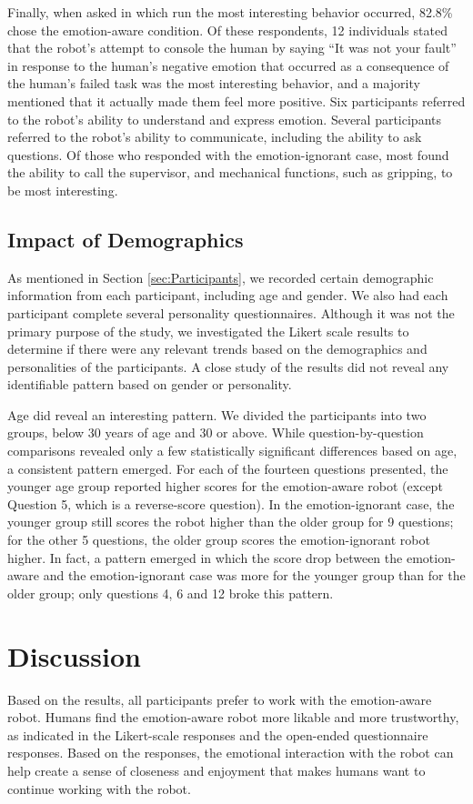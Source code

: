 \documentclass{sig-alternate-05-2015}
\begin{document}
Finally, when asked in which run the most interesting behavior occurred, 82.8\%
chose the emotion-aware condition. Of these respondents, 12 individuals stated
that the robot's attempt to console the human by saying ``It was not your
fault'' in response to the human's negative emotion that occurred as a
consequence of the human's failed task was the most interesting behavior, and a
majority mentioned that it actually made them feel more positive. Six
participants referred to the robot's ability to understand and express emotion.
Several participants referred to the robot's ability to communicate, including
the ability to ask questions. Of those who responded with the emotion-ignorant
case, most found the ability to call the supervisor, and mechanical functions,
such as gripping, to be most interesting.

\subsection{Impact of Demographics} 
As mentioned in Section \ref{sec:Participants}, we recorded certain demographic
information from each participant, including age and gender. We also had each
participant complete several personality questionnaires. Although it was not the
primary purpose of the study, we investigated the Likert scale results to
determine if there were any relevant trends based on the demographics and
personalities of the participants. A close study of the results did  not reveal
any identifiable pattern based on gender or personality.
 
Age did reveal an interesting pattern. We divided the participants into two
groups, below 30 years of age and 30 or above. While question-by-question
comparisons revealed only a few statistically significant differences based on
age, a consistent pattern emerged. For each of the fourteen questions presented,
the younger age group reported higher scores for the emotion-aware robot (except
Question 5, which is a reverse-score question). In the emotion-ignorant case,
the younger group still scores the robot higher than the older group for 9
questions; for the other 5 questions, the older group scores the
emotion-ignorant robot higher. In fact, a pattern emerged in which the score
drop between the emotion-aware and the emotion-ignorant case was more for the
younger group than for the older group; only questions 4, 6 and 12 broke this
pattern.

\vspace*{-2mm}
\section{Discussion}
Based on the results, all participants prefer to work with the emotion-aware
robot. Humans find the emotion-aware robot more likable and more trustworthy, as
indicated in the Likert-scale responses and the open-ended questionnaire
responses. Based on the responses, the emotional interaction with the robot can
help create a sense of closeness and enjoyment that makes humans want to
continue working with the robot.
\end{document}
